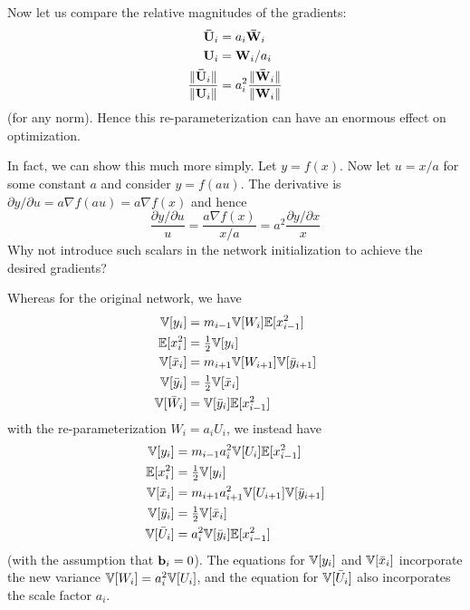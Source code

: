 Now let us compare the relative magnitudes of the gradients:
\begin{align}
\boldsymbol{\mathbf{\bar{U}}}_{i} & = a_{i} \boldsymbol{\mathbf{\bar{W}}}_{i} \\
\boldsymbol{\mathbf{U}}_{i} & = \boldsymbol{\mathbf{W}}_{i} / a_{i} \\
\frac{\| \boldsymbol{\mathbf{\bar{U}}}_{i} \|}{\| \boldsymbol{\mathbf{U}}_{i} \|} & = a_{i}^{2} \frac{\| \boldsymbol{\mathbf{\bar{W}}}_{i} \|}{\| \boldsymbol{\mathbf{W}}_{i} \|}
\end{align}
(for any norm).
Hence this re-parameterization can have an enormous effect on optimization.

In fact, we can show this much more simply.
Let $y = f(x)$.
Now let $u = x / a$ for some constant $a$ and consider $y = f(a u)$.
The derivative is $\partial y / \partial u = a \nabla f(a u) = a \nabla f(x)$ and hence
\begin{equation}
\frac{\partial y / \partial u}{u} = \frac{a \nabla f(x)}{x / a} = a^2 \frac{\partial y / \partial x}{x}
\end{equation}
Why not introduce such scalars in the network initialization to achieve the desired gradients?

Whereas for the original network, we have
\begin{align}
\mathbb{V}[y_{i}] & = m_{i - 1} \mathbb{V}[W_{i}] \mathbb{E}[x_{i - 1}^2] \\
\mathbb{E}[x_{i}^2] & = \tfrac{1}{2} \mathbb{V}[y_{i}] \\
\mathbb{V}[\bar{x}_{i}] & = m_{i+1} \mathbb{V}[W_{i+1}] \mathbb{V}[\bar{y}_{i+1}] \\
\mathbb{V}[\bar{y}_{i}] & = \tfrac{1}{2} \mathbb{V}[\bar{x}_{i}] \\
\mathbb{V}[\bar{W}_{i}] & = \mathbb{V}[\bar{y}_{i}] \mathbb{E}[x_{i - 1}^2]
\end{align}
with the re-parameterization $W_{i} = a_{i} U_{i}$, we instead have
\begin{align}
\mathbb{V}[y_{i}] & = m_{i-1} a_{i}^2 \mathbb{V}[U_{i}] \mathbb{E}[x_{i-1}^2] \\
\mathbb{E}[x_{i}^2] & = \tfrac{1}{2} \mathbb{V}[y_{i}] \\
\mathbb{V}[\bar{x}_{i}] & = m_{i+1} a_{i+1}^2 \mathbb{V}[U_{i+1}] \mathbb{V}[\bar{y}_{i+1}] \\
\mathbb{V}[\bar{y}_{i}] & = \tfrac{1}{2} \mathbb{V}[\bar{x}_{i}] \\
\mathbb{V}[\bar{U}_{i}] & = a_{i}^2 \mathbb{V}[\bar{y}_{i}] \mathbb{E}[x_{i-1}^2]
\end{align}
(with the assumption that $\boldsymbol{\mathbf{b}}_{i} = 0$).
The equations for $\mathbb{V}[y_{i}]$ and $\mathbb{V}[\bar{x}_{i}]$ incorporate the new variance $\mathbb{V}[W_{i}] = a_{i}^2 \mathbb{V}[U_{i}]$, and the equation for $\mathbb{V}[\bar{U}_{i}]$ also incorporates the scale factor $a_{i}$.

